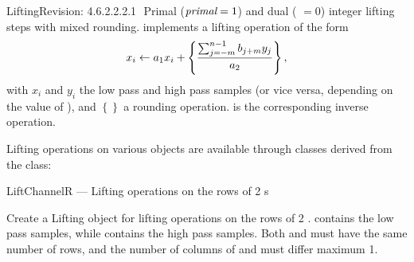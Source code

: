 \begin{manpage}{\libtitle}{Lifting}{$ $Revision: 4.6.2.2.2.1 $ $}
    Primal ($\emph{primal} = 1$) and dual ( $= 0$) integer lifting
    steps with mixed rounding.  implements a lifting
    operation of the form
    \[ x_i \leftarrow a_1 x_i + \left\{ {\sum_{j=-m}^{n-1} b_{j+m} y_j \over
       a_2} \right\}, \]
    with $x_i$ and $y_i$ the low pass and high pass samples (or vice versa,
    depending on the value of ), and $\left\{\right\}$ a rounding
    operation.
     is the corresponding inverse operation.


\separator

\subtitle{Derived \\ Classes}
    Lifting operations on various objects are available through classes derived
    from the  class:


\separator

\subtitle{Name}
    LiftChannelR --- Lifting operations on the rows of 2 s


\subtitle{Declaration}

    Create a Lifting object for lifting operations on the rows of 2
    .
     contains the low pass samples, while 
    contains the high pass samples. Both  and 
    must have the same number of rows, and the number of columns of
     and  must differ maximum 1.



\end{manpage}
